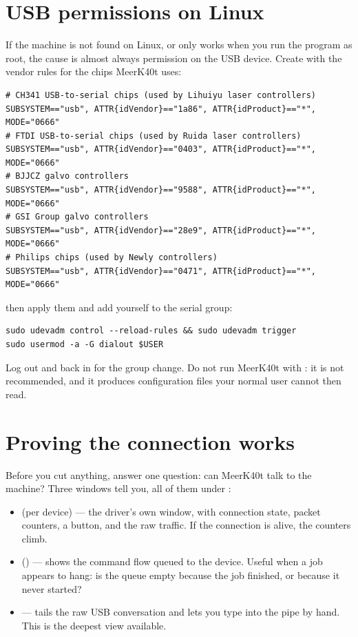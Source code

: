 \section{USB permissions on Linux}

If the machine is not found on Linux, or only works when you run the program as
root, the cause is almost always permission on the USB device. Create
 with the vendor rules for the chips
MeerK40t uses:

\begin{lstlisting}[style=file]
# CH341 USB-to-serial chips (used by Lihuiyu laser controllers)
SUBSYSTEM=="usb", ATTR{idVendor}=="1a86", ATTR{idProduct}=="*", MODE="0666"
# FTDI USB-to-serial chips (used by Ruida laser controllers)
SUBSYSTEM=="usb", ATTR{idVendor}=="0403", ATTR{idProduct}=="*", MODE="0666"
# BJJCZ galvo controllers
SUBSYSTEM=="usb", ATTR{idVendor}=="9588", ATTR{idProduct}=="*", MODE="0666"
# GSI Group galvo controllers
SUBSYSTEM=="usb", ATTR{idVendor}=="28e9", ATTR{idProduct}=="*", MODE="0666"
# Philips chips (used by Newly controllers)
SUBSYSTEM=="usb", ATTR{idVendor}=="0471", ATTR{idProduct}=="*", MODE="0666"
\end{lstlisting}

\noindent then apply them and add yourself to the serial group:

\begin{lstlisting}[style=konsole]
sudo udevadm control --reload-rules && sudo udevadm trigger
sudo usermod -a -G dialout $USER
\end{lstlisting}

\noindent Log out and back in for the group change. Do not run MeerK40t with
: it is not recommended, and it produces configuration files your
normal user cannot then read.

\section{Proving the connection works}

Before you cut anything, answer one question: can MeerK40t talk to the machine?
Three windows tell you, all of them under :

\begin{itemize}
  \item {} (per device) --- the driver's own window, with
        connection state, packet counters, a  button,
         and the raw traffic. If the connection is alive,
        the counters climb.
  \item {} () --- shows the command flow queued to
        the device. Useful when a job appears to hang: is the queue empty because
        the job finished, or because it never started?
  \item {} --- tails the raw USB conversation and lets you type
        into the pipe by hand. This is the deepest view available.
\end{itemize}


